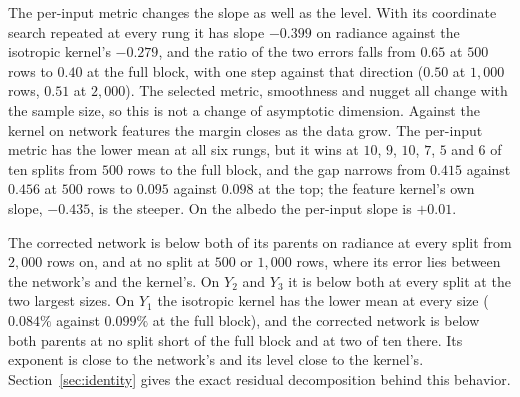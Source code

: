 \documentclass[11pt]{article}
\newcommand{\1}{\mathbf{1}}
\begin{document}
The per-input metric changes the slope as well as the level. With its coordinate search repeated
at every rung it has slope $-0.399$ on radiance against the isotropic kernel's $-0.279$, and the
ratio of the two errors falls from $0.65$ at $500$ rows to $0.40$ at the full block, with one step
against that direction ($0.50$ at $1{,}000$ rows, $0.51$ at $2{,}000$). The selected metric,
smoothness and nugget all change with the sample size, so this is not a change of asymptotic
dimension. Against the kernel on network features the margin closes as the data grow. The
per-input metric has the lower mean at all six rungs, but it wins at $10$, $9$, $10$, $7$, $5$ and
$6$ of ten splits from $500$ rows to the full block, and the gap narrows from $0.415$ against
$0.456$ at $500$ rows to $0.095$ against $0.098$ at the top; the feature kernel's own slope,
$-0.435$, is the steeper. On the albedo the per-input slope is $+0.01$.

The corrected network is below both of its parents on radiance at every split from $2{,}000$
rows on, and at no split at $500$ or $1{,}000$ rows, where its error lies between the network's
and the kernel's. On $Y_2$ and $Y_3$ it is below both at every split at the two largest sizes. On
$Y_1$ the isotropic kernel has the lower mean at every size ($0.084\%$ against $0.099\%$ at the
full block), and the corrected network is below both parents at no split short of the full block
and at two of ten there. Its exponent is close to the network's and its level close
to the kernel's. Section~\ref{sec:identity} gives the exact residual decomposition behind this
behavior.

\begin{table}[t]
\centering\small
\resizebox{\textwidth}{!}{}
\caption{Output-rank ablation: radiance relative $L^2$ error [\%] when the kernels and corrections
regress the leading $r$ principal coefficients, mean $\pm$ standard deviation over five splits.
The second column is the fraction of the standardized variance the basis leaves out for the
slowest-decaying component, the spherical albedo; at rank 285 it is zero. The network regresses
the 285 bands directly and is the same predictor in every row.}
\label{tab:rank}
\end{table}
\end{document}
